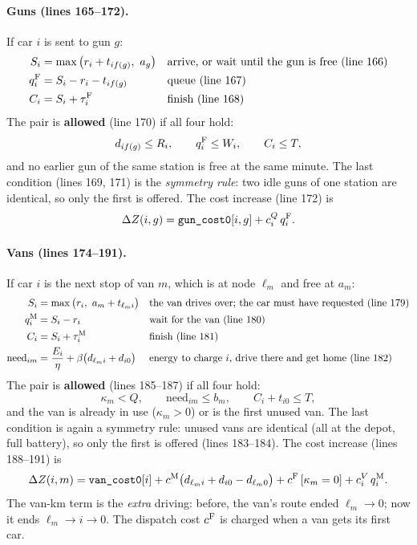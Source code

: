 \paragraph{Guns (lines 165--172).} If car $i$ is sent to gun $g$:
\begin{align*}
S_i&=\max\big(r_i+t_{if(g)},\ a_g\big) &&\text{arrive, or wait until the gun is free (line 166)}\\
q^{\mathrm{F}}_i&=S_i-r_i-t_{if(g)} &&\text{queue (line 167)}\\
C_i&=S_i+\tau^{\mathrm{F}}_i &&\text{finish (line 168)}
\end{align*}
The pair is \textbf{allowed} (line 170) if all four hold:
\[
d_{if(g)}\le R_i,\qquad q^{\mathrm{F}}_i\le W_i,\qquad C_i\le T,
\]
and no earlier gun of the same station is free at the same minute.
The last condition (lines 169, 171) is the \emph{symmetry rule}: two idle guns of one station are identical, so only the first is offered. The cost increase (line 172) is
\[
\Delta Z(i,g)=\text{\texttt{gun\_cost0}}[i,g]+c^Q_i\,q^{\mathrm{F}}_i .
\]

\paragraph{Vans (lines 174--191).} If car $i$ is the next stop of van $m$, which is at node $\ell_m$ and free at $a_m$:
\begin{align*}
S_i&=\max\big(r_i,\ a_m+t_{\ell_m i}\big) &&\text{the van drives over; the car must have requested (line 179)}\\
q^{\mathrm{M}}_i&=S_i-r_i &&\text{wait for the van (line 180)}\\
C_i&=S_i+\tau^{\mathrm{M}}_i &&\text{finish (line 181)}\\
\text{need}_{im}&=\frac{E_i}{\eta}+\beta\big(d_{\ell_m i}+d_{i0}\big) &&\text{energy to charge $i$, drive there and get home (line 182)}
\end{align*}
The pair is \textbf{allowed} (lines 185--187) if all four hold:
\[
\kappa_m<Q,\qquad \text{need}_{im}\le b_m,\qquad C_i+t_{i0}\le T,
\]
and the van is already in use ($\kappa_m>0$) or is the first unused van.
The last condition is again a symmetry rule: unused vans are identical (all at the depot, full battery), so only the first is offered (lines 183--184). The cost increase (lines 188--191) is
\[
\Delta Z(i,m)=\text{\texttt{van\_cost0}}[i]+c^{\mathrm{M}}\big(d_{\ell_m i}+d_{i0}-d_{\ell_m0}\big)+c^{\mathrm{F}}\,[\kappa_m=0]+c^V_i\,q^{\mathrm{M}}_i .
\]
The van-km term is the \emph{extra} driving: before, the van's route ended $\ell_m\to0$; now it ends $\ell_m\to i\to0$. The dispatch cost $c^{\mathrm{F}}$ is charged when a van gets its first car.

